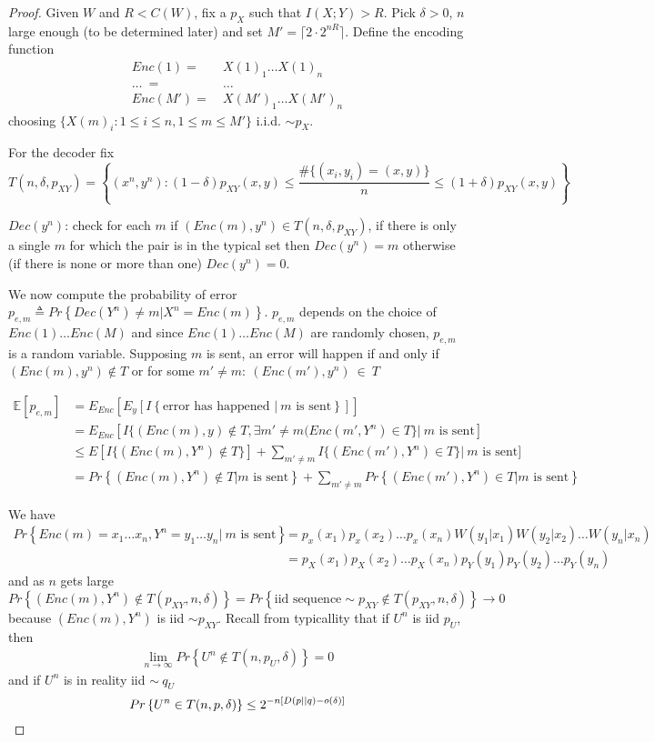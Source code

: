 \documentclass[twoside]{article}
\theoremstyle{definition} %
\renewcommand{\Pr}[1]{Pr\left\{#1\right\}}
\newcommand{\Ex}[1]{\mathbb{E}\left[#1\right]}
\begin{document}
\begin{proof}
  Given $W$ and $R<C(W)$, fix a $p_X$ such that $I(X;Y)>R$. Pick $\delta > 0$, $n$
  large enough (to be determined later) and set $M' = \lceil 2 \cdot 2^{nR} \rceil$. Define the
  encoding function
  \begin{align*}
    Enc(1) =~&X(1)_1 \dots  X(1)_n\\
    \dots~=~&\dots\\
    Enc(M') =~&X(M')_1 \dots X(M')_n
  \end{align*}
  choosing $\{X(m)_i : 1 \leq i \leq n, 1 \leq m \leq M' \}$ i.i.d. $\sim p_X$.

  For the decoder fix
  \[
    T(n, \delta, p_{XY})= \left\{(x^n, y^n): (1-\delta)p_{XY}(x,y) \leq \frac {\# \{(x_i, y_i) = (x,y)\}} n \leq (1+\delta)p_{XY}(x,y)\right\}
  \]

  $Dec(y^n)$: check for each $m$ if $(Enc(m), y^n) \in T(n,\delta, p_{XY})$, if there is
  only a single $m$ for which the pair is in the typical set then $Dec(y^n) = m$ otherwise
  (if there is none or more than one) $Dec(y^n) = 0$.

  We now compute the probability of error $p_{e,m} \triangleq \Pr{Dec(Y^n) \not = m | X^n = Enc(m)}$. $p_{e,m}$ depends on the choice of $Enc(1) \dots Enc(M)$ and since $Enc(1) \dots Enc(M)$ are randomly chosen, $p_{e,m}$ is a random variable. Supposing $m$ is sent, an error will happen if and only if $(Enc(m), y^n) \not \in T$ or for some $m' \not = m:~(Enc(m'), y^n)~\in~T$

  \begin{align*}
    \Ex{p_{e,m}} &= E_{Enc}[ E_{y} [ I\left\{\text{error has happened $|~m$ is sent}\right\}]]\\
    &= E_{Enc}[ I\{(Enc(m),y) \not \in T, \exists m' \not=m (Enc(m', Y^n) \in T\} |~m \text{ is sent}]\\
    &\leq E[I\{(Enc(m), Y^n) \not \in T\}] + \sum_{m' \not = m} I\{(Enc(m'), Y^n) \in T\} |~m \text{ is sent}]\\
    &= \Pr{(Enc(m), Y^n) \not \in T | m \text{ is sent}} + \sum_{m'\not = m} \Pr{(Enc(m'), Y^n) \in T| m \text{ is sent}}
  \end{align*}

  We have
  \begin{align*}
    \Pr{Enc(m) = x_1\dots x_n, Y^n=y_1 \dots y_n |~m \text{ is sent}}
    &= p_x(x_1)p_x(x_2)\dots p_x(x_n)W(y_1|x_1)W(y_2|x_2) \dots W(y_n|x_n) \\
    &= p_X(x_1)p_X(x_2)\dots p_X(x_n)p_Y(y_1)p_Y(y_2)\dots p_Y(y_n)
  \end{align*}
  and as $n$ gets large
  \[
    \Pr{(Enc(m), Y^n) \not \in T (p_{XY}, n, \delta)} = \Pr{\text{iid sequence} \sim p_{XY} \not \in T(p_{XY}, n, \delta)} \to 0
  \]
because $(Enc(m), Y^n)$ is iid $\sim p_{XY}$. Recall from typicallity that if $U^n$ is iid $p_U$, then
\begin{align*}
  \lim_{n\to\infty} \Pr{U^n \not \in T(n, p_U, \delta)} = 0
\end{align*}
and if $U^n$ is in reality iid $\sim~q_U$
\[
  \Pr{U^n \in T(n,p,\delta)} \leq 2^{-n[D(p||q) - o(\delta)]}\\
\]


\end{proof}
\end{document}
